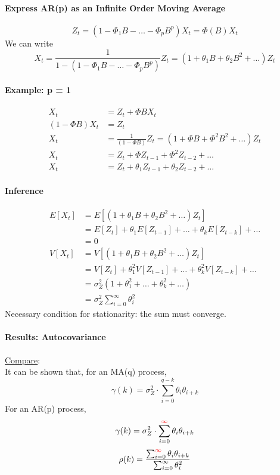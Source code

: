 \documentclass[11pt]{article}
\newcommand{\under}[1]{\underline{#1}}
\begin{document}
\paragraph{Express AR(p) as an Infinite Order Moving Average}
$$Z_t = (1 - \Phi_1B - \hdots - \Phi_pB^p)X_t = \Phi(B)X_t$$
We can write
$$X_t = \frac{1}{1 - (1 - \Phi_1B - \hdots - \Phi_pB^p)}Z_t = (1 + \theta_1 B + \theta_2 B^2 + \hdots) Z_t$$
\paragraph{Example: p = 1}
\begin{align*}
	X_t &= Z_t + \Phi BX_t \\
	(1 - \Phi B) X_t &= Z_t \\
	X_t &= \frac{1}{(1 - \Phi B)}Z_t = (1 + \Phi B + \Phi^2B^2 + \hdots) Z_t \\
	X_t &= Z_t + \Phi Z_{t-1} + \Phi^2 Z_{t-2} + \hdots \\
	X_t &= Z_t + \theta_1 Z_{t-1} + \theta_2 Z_{t-2} + \hdots
\end{align*}

\paragraph{Inference}
\begin{align*}
	E[X_t] &= E[(1 + \theta_1 B + \theta_2 B^2 + \hdots)Z_t] \\
	&= E[Z_t] + \theta_1 E[Z_{t-1}] + \hdots + \theta_k E[Z_{t-k}] + \hdots \\
	&= 0 \\
	V[X_t] &= V[(1 + \theta_1 B + \theta_2 B^2 + \hdots)Z_t] \\
	&= V[Z_t] + \theta_1^2 V[Z_{t-1}] + \hdots + \theta_k^2 V[Z_{t-k}] + \hdots \\
	&= \sigma_Z^2 (1 + \theta_1^2 + \hdots + \theta_k^2 + \hdots) \\
	&= \sigma_Z^2 \sum_{i=0}^\infty \theta_i^2
\end{align*}
Necessary condition for stationarity: the sum must converge. \\
\paragraph{Results: Autocovariance}\under{Compare}: \\
It can be shown that, for an MA(q) process,
$$\gamma(k) = \sigma_Z^2 \cdot \sum_{i=0}^{q-k} \theta_i \theta_{i+k}$$
For an AR(p) process,
$$\gamma(k) = \sigma_Z^2 \cdot \sum_{i=0}^{\textcolor{red}{\infty}} \theta_i \theta_{i+k}$$
$$\rho(k) = \frac{\sum_{i=0}^{\textcolor{red}{\infty}} \theta_i \theta_{i+k}}{\sum_{i=0}^\infty \theta_i^2}$$
\end{document}

